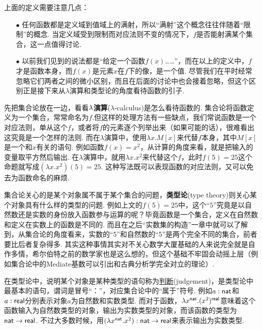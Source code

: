 \documentclass[main.tex]{subfiles}
\begin{document}
上面的定义需要注意几点：
\begin{itemize}
    \item [\(\bullet\)] 任何函数都是定义域到值域上的满射，所以“满射”这个概念往往伴随着“限制”的概念. 当定义域受到限制而对应法则不变的情况下，\(f\)是否能射满某个集合，这一点值得讨论.
    \item [\(\bullet\)] 以前我们见到的说法都是“给定一个函数\(f(x)\)……”，而在以上的定义中，\(f\)才是函数本身，而\(f(x)\)是元素\(x\)在\(f\)下的像，是一个值. 尽管我们在平时经常忽略它们两者之间的微小区别，而且在后面的讨论中也会接着忽略，但这个区别正是接下来从\(\lambda\)演算和类型论的角度看待函数的引子.
\end{itemize}

先把集合论放在一边，看看\({\rm \lambda}\)\textbf{演算}(\(\lambda\)-calculus)是怎么看待函数的. 集合论将函数定义为一个集合，常常命名为\(f\).但这样的处理方法有一些缺点，我们常说函数是一个对应法则，单从这个\(f\)，或者将\(f\)的元素逐个列举出来（如果可能的话），很难看出这究竟是一个怎样的法则. 而在\(\lambda\)演算中，使用\(\lambda x.M[x]\)来代替\(f\)本身，其中\(M[x]\)是一个和\(x\)有关的语句. 例如函数\(f(x)=x^2\)，从计算的角度来看，就是把输入的变量取平方然后输出. 在\(\lambda\)演算中，就用\(\lambda x.x^2\)来代替这个\(f\)，此时\(f(5)=25\)这个命题就写成\((\lambda x.x^2)(5)=25\). 这种写法既可以表现函数的对应法则，又可以免去为函数命名的麻烦.

集合论关心的是某个对象属不属于某个集合的问题，\textbf{类型论}(type theory)则关心某个对象具有什么样的类型的问题. 例如上文的\(f(5)=25\)中，这个“\(5\)”究竟是以自然数还是实数的身份放入函数参与运算的呢？毕竟函数是一个集合，定义在自然数和定义在实数上的函数是不同的. 而且在之后“实数集的构造”一章中就可以了解到，从集合论的角度看来，实数的“5”和自然数的“5”是两个完全不同的集合，前者要比后者复杂得多. 其实这种事情其实对不关心数学大厦基础的人来说完全就是自作多情，希尔伯特之前的数学家也是这么想的，但这个基础不牢固会动摇上层（例如集合论中的Mediate基数可以引出和古典分析学完全对立的理论）.

在类型论中，说明某个对象是某种类型的语句称为\uline{判断}(judgement)，是类型论中最基本的语句，谓词是冒号“：”，对应集合论中的“属于”符号. 例如\(a:{\sf nat}\)和\(a:{\sf real}\)分别表示对象\(a\)为自然数和实数类型. 而对于函数，\(\lambda x^{\sf nat}. (x^2)^{\sf real}\)意味着这个函数输入为自然数类型的对象，输出为实数类型的对象，而该函数的类型为\({\sf nat}\to{\sf real}\). 不过大多数时候，用\((\lambda x^{\sf nat}. x^2):{\sf nat} \to {\sf real}\)来表示输出为实数类型.
\end{document}

